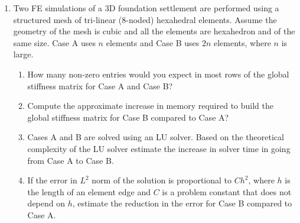 \documentclass[a4paper,12pt]{article}
\begin{document}
\begin{enumerate}
	
	\item Two FE simulations of a 3D foundation settlement are performed using a structured mesh of tri-linear (8-noded) hexahedral elements. Assume the geometry of the mesh is cubic and all the elements are hexahedron and of the same size. Case A uses $n$ elements and Case B uses $2n$ elements, where $n$ is large.
		\begin{enumerate}
			\item How many non-zero entries would you expect in most rows of the global stiffness matrix for Case A and Case B?
			\item Compute the approximate increase in memory required to build the global stiffness matrix for Case B compared to Case A?
			\item Cases A and B are solved using an LU solver. Based on the theoretical complexity of the LU solver estimate the increase in solver time in going from Case A to Case B.
			\item If the error in $L^2$ norm of the solution is proportional to $Ch^2$, where $h$ is the length of an element edge and $C$ is a problem constant that does not depend on $h$, estimate the reduction in the error for Case B compared to Case A.
		\end{enumerate}
\end{enumerate}
\end{document}
